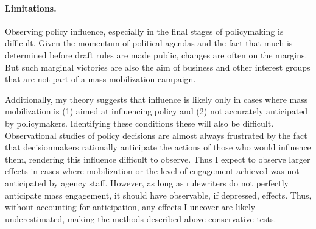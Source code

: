 
\paragraph{Limitations.} 

Observing policy influence, especially in the final stages of policymaking is difficult. Given the momentum of political agendas and the fact that much is determined before draft rules are made public, changes are often on the margins. But such marginal victories are also the aim of business and other interest groups that are not part of a mass mobilization campaign. 

Additionally, my theory suggests that influence is likely only in cases where mass mobilization is (1) aimed at influencing policy and (2) not accurately anticipated by policymakers. Identifying these conditions these will also be difficult.
Observational studies of policy decisions are almost always frustrated by the fact that decisionmakers rationally anticipate the actions of those who would influence them, rendering this influence difficult to observe. Thus I expect to observe larger effects in cases where mobilization or the level of engagement achieved was not anticipated by agency staff. However, as long as rulewriters do not perfectly anticipate mass engagement, it should have observable, if depressed, effects. Thus, without accounting for anticipation, any effects I uncover are likely underestimated, making the methods described above conservative tests.






